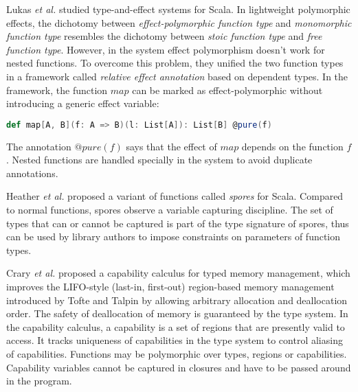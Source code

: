 Lukas \emph{et al.}  studied type-and-effect systems for
Scala\cite{rytz2012lightweight, rytz2013flow, lukas2014effect}.  In
lightweight polymorphic effects\cite{rytz2012lightweight}, the
dichotomy between \emph{effect-polymorphic function type} and
\emph{monomorphic function type} resembles the dichotomy between
\emph{stoic function type} and \emph{free function type}. However, in
the system effect polymorphism doesn't work for nested functions. To
overcome this problem, they unified the two function types in a
framework called \emph{relative effect annotation} based on dependent
types. In the framework, the function $map$ can be marked as
effect-polymorphic without introducing a generic effect variable:

\begin{lstlisting}[language=Scala]
def map[A, B](f: A => B)(l: List[A]): List[B] @pure(f)
\end{lstlisting}

The annotation $@pure(f)$ says that the effect of $map$ depends on the
function $f$. Nested functions are handled specially in the system to
avoid duplicate annotations.


Heather \emph{et al.} proposed a variant of functions called
\emph{spores} for Scala\cite{miller2014spores}. Compared to normal
functions, spores observe a variable capturing discipline. The set of
types that can or cannot be captured is part of the type signature of
spores, thus can be used by library authors to impose constraints on
parameters of function types.


Crary \emph{et al.} proposed a capability calculus for typed memory
management\cite{crary1999typed}, which improves the LIFO-style
(last-in, first-out) region-based memory management introduced by
Tofte and Talpin\cite{tofte1997region} by allowing arbitrary
allocation and deallocation order. The safety of deallocation of
memory is guaranteed by the type system. In the capability calculus, a
capability is a set of regions that are presently valid to access. It
tracks uniqueness of capabilities in the type system to control
aliasing of capabilities. Functions may be polymorphic over types,
regions or capabilities. Capability variables cannot be captured in
closures and have to be passed around in the program.

